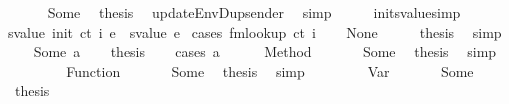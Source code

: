 \begin{isabellebody}
\ \ \ \ \isamarkupfalse%
\ Some\ \isamarkupfalse%
\ {\isacharquery}{\kern0pt}thesis\ \isamarkupfalse%
\ updateEnvDup{\isacharunderscore}{\kern0pt}sender\ \isamarkupfalse%
\ simp\isanewline
\ \ \isamarkupfalse%
\ \isanewline
{}\isamarkupfalse%
%
\endisatagproof
{\isafoldproof}%
%
\isadelimproof
\isanewline
%
\endisadelimproof
\isanewline
{}\isamarkupfalse%
\ init{\isacharunderscore}{\kern0pt}svalue{\isacharbrackleft}{\kern0pt}simp{\isacharbrackright}{\kern0pt}{\isacharcolon}{\kern0pt}\isanewline
{\isachardoublequoteopen}svalue\ {\isacharparenleft}{\kern0pt}init\ ct\ i\ e{\isacharparenright}{\kern0pt}\ {\isacharequal}{\kern0pt}\ svalue\ e{\isachardoublequoteclose}\isanewline
%
\isadelimproof
%
\endisadelimproof
%
\isatagproof
{}\isamarkupfalse%
\ {\isacharparenleft}{\kern0pt}cases\ {\isachardoublequoteopen}fmlookup\ ct\ i{\isachardoublequoteclose}{\isacharparenright}{\kern0pt}\isanewline
\ \ \isamarkupfalse%
\ None\isanewline
\ \ \isamarkupfalse%
\ \isamarkupfalse%
\ {\isacharquery}{\kern0pt}thesis\ \isamarkupfalse%
\ simp\isanewline
{}\isamarkupfalse%
\isanewline
\ \ \isamarkupfalse%
\ {\isacharparenleft}{\kern0pt}Some\ a{\isacharparenright}{\kern0pt}\isanewline
\ \ \isamarkupfalse%
\ {\isacharquery}{\kern0pt}thesis\isanewline
\ \ \isamarkupfalse%
\ {\isacharparenleft}{\kern0pt}cases\ a{\isacharparenright}{\kern0pt}\isanewline
\ \ \ \ \isamarkupfalse%
\ {\isacharparenleft}{\kern0pt}Method\ {\isacharunderscore}{\kern0pt}{\isacharparenright}{\kern0pt}\isanewline
\ \ \ \ \isamarkupfalse%
\ Some\ \isamarkupfalse%
\ {\isacharquery}{\kern0pt}thesis\ \isamarkupfalse%
\ simp\isanewline
\ \ \isamarkupfalse%
\isanewline
\ \ \ \ \isamarkupfalse%
\ {\isacharparenleft}{\kern0pt}Function\ {\isacharunderscore}{\kern0pt}{\isacharparenright}{\kern0pt}\isanewline
\ \ \ \ \isamarkupfalse%
\ Some\ \isamarkupfalse%
\ {\isacharquery}{\kern0pt}thesis\ \isamarkupfalse%
\ simp\isanewline
\ \ \isamarkupfalse%
\isanewline
\ \ \ \ \isamarkupfalse%
\ {\isacharparenleft}{\kern0pt}Var\ {\isacharunderscore}{\kern0pt}{\isacharparenright}{\kern0pt}\isanewline
\ \ \ \ \isamarkupfalse%
\ Some\ \isamarkupfalse%
\ {\isacharquery}{\kern0pt}thesis\ \isamarkupfalse%

\end{isabellebody}
